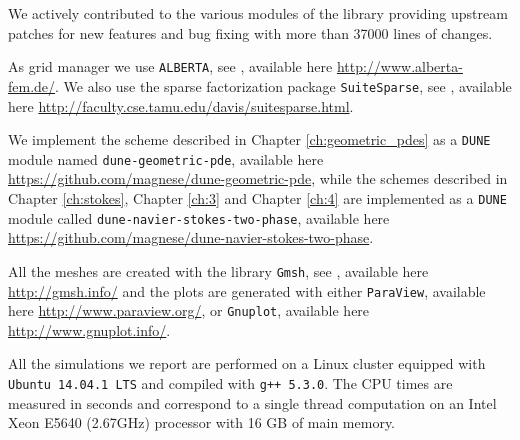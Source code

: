 We actively contributed to the various modules of the library providing
upstream patches for new features and bug fixing with more than 37000 lines of
changes.

As grid manager we use \verb|ALBERTA|, see \cite{Alberta}, available here
\url{http://www.alberta-fem.de/}. We also use the sparse factorization
package \verb|SuiteSparse|, see \cite{Davis04}, available here
\url{http://faculty.cse.tamu.edu/davis/suitesparse.html}.

We implement the scheme described in Chapter \ref{ch:geometric_pdes} as a
\verb|DUNE| module named \verb|dune-geometric-pde|, available here
\url{https://github.com/magnese/dune-geometric-pde}, while the schemes described
in Chapter \ref{ch:stokes}, Chapter \ref{ch:3} and Chapter \ref{ch:4} are
implemented as a \verb|DUNE| module called \verb|dune-navier-stokes-two-phase|,
available here \url{https://github.com/magnese/dune-navier-stokes-two-phase}.

All the meshes are created with the library \verb|Gmsh|, see
\cite{GeuzaineR09}, available here \url{http://gmsh.info/} and the plots are
generated with either \verb|ParaView|, available here
\url{http://www.paraview.org/}, or \verb|Gnuplot|, available here
\url{http://www.gnuplot.info/}.

All the simulations we report are performed on a Linux cluster equipped with
\verb|Ubuntu 14.04.1 LTS| and compiled with \verb|g++ 5.3.0|. The CPU times
are measured in seconds and correspond to a single thread computation on an
Intel Xeon E5640 (2.67GHz) processor with 16 GB of main memory.
